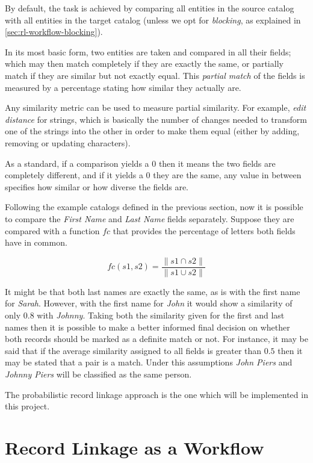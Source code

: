 \documentclass[epsfig,a4paper,11pt,titlepage,twoside,openany]{book}
\begin{document}
By default, the task is achieved by comparing all entities in the source catalog with all entities in the target catalog (unless we opt for \textit{blocking}, as explained in \autoref{sec:rl-workflow-blocking}). 

In its most basic form, two entities are taken and compared in all their fields; which may then match completely if they are exactly the same, or partially match if they are similar but not exactly equal. This \textit{partial match} of the fields is measured by a percentage stating how similar they actually are. 

Any similarity metric can be used to measure partial similarity. For example, \textit{edit distance} for strings, which is basically the number of changes needed to transform one of the strings into the other in order to make them equal (either by adding, removing or updating characters). 

As a standard, if a comparison yields a 0 then it means the two fields are completely different, and if it yields a 0 they are the same, any value in between specifies how similar or how diverse the fields are.

Following the example catalogs defined in the previous section, now it is possible to compare the \textit{First Name} and \textit{Last Name} fields separately.
Suppose they are compared with a function $fc$ that provides the percentage of
letters both fields have in common.


$$
fc(s1, s2) = \frac{\| s1 \cap s2 \|}{\| s1 \cup s2 \|}
$$


It might be that both last names are exactly the same, as is with the first name for \textit{Sarah}. However, with the first name for \textit{John} it would show a similarity of only $0.8$ with \textit{Johnny}. Taking both the similarity given for the first and last names then it is possible to make a better informed final decision on whether both records should be marked as a definite match or not.  For instance, it may be said that if the average similarity assigned to all fields is greater than $0.5$ then it may be stated that a pair is a match. Under this assumptions \textit{John Piers} and \textit{Johnny Piers} will be classified as the same person.

The probabilistic record linkage approach is the one which will be implemented in this project.


\section{Record Linkage as a Workflow}
\label{sec:rl-as-a-workflow}
\end{document}
